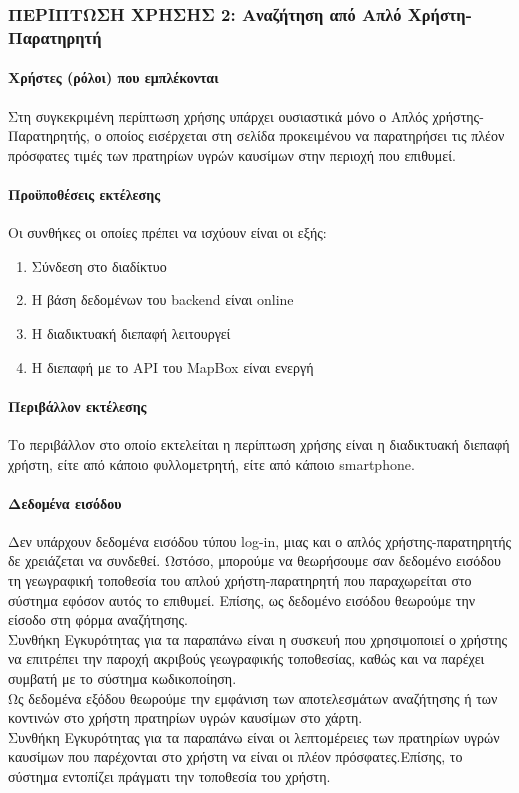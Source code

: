 \subsubsection{ΠΕΡΙΠΤΩΣΗ ΧΡΗΣΗΣ 2: Αναζήτηση από Απλό Χρήστη-Παρατηρητή }
\paragraph{Χρήστες (ρόλοι) που εμπλέκονται}
Στη συγκεκριμένη περίπτωση χρήσης υπάρχει ουσιαστικά μόνο ο Απλός χρήστης-Παρατηρητής, ο οποίος εισέρχεται στη σελίδα προκειμένου να παρατηρήσει τις πλέον πρόσφατες τιμές των πρατηρίων υγρών καυσίμων στην περιοχή που επιθυμεί.
\paragraph{Προϋποθέσεις εκτέλεσης}
Οι συνθήκες οι οποίες πρέπει να ισχύουν είναι οι εξής: 
\begin{enumerate}
	\item Σύνδεση στο διαδίκτυο
	\item Η βάση δεδομένων του backend είναι online
	\item Η διαδικτυακή διεπαφή λειτουργεί
	\item Η διεπαφή με το API του MapBox είναι ενεργή
\end{enumerate}
\paragraph{Περιβάλλον εκτέλεσης}
Το περιβάλλον στο οποίο εκτελείται η περίπτωση χρήσης είναι η διαδικτυακή διεπαφή χρήστη, είτε από κάποιο φυλλομετρητή, είτε από κάποιο smartphone.
\paragraph{Δεδομένα εισόδου}
Δεν υπάρχουν δεδομένα εισόδου τύπου log-in, μιας και ο απλός χρήστης-παρατηρητής δε χρειάζεται να συνδεθεί. Ωστόσο, μπορούμε να θεωρήσουμε σαν δεδομένο εισόδου τη γεωγραφική τοποθεσία του απλού χρήστη-παρατηρητή που παραχωρείται στο σύστημα εφόσον αυτός το επιθυμεί. Επίσης, ως δεδομένο εισόδου θεωρούμε την είσοδο στη φόρμα αναζήτησης. \\
Συνθήκη Εγκυρότητας για τα παραπάνω είναι η συσκευή που χρησιμοποιεί ο χρήστης να επιτρέπει την παροχή ακριβούς γεωγραφικής τοποθεσίας, καθώς και να παρέχει συμβατή με το σύστημα κωδικοποίηση. \\
Ως δεδομένα εξόδου θεωρούμε την εμφάνιση των αποτελεσμάτων αναζήτησης ή των κοντινών στο χρήστη πρατηρίων υγρών καυσίμων στο χάρτη. \\
Συνθήκη Εγκυρότητας για τα παραπάνω είναι  οι λεπτομέρειες των πρατηρίων υγρών καυσίμων που παρέχονται στο χρήστη να είναι οι πλέον πρόσφατες.Επίσης, το σύστημα εντοπίζει πράγματι την τοποθεσία του χρήστη.

